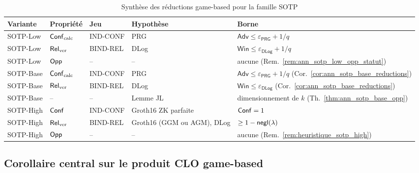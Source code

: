\begin{sloppypar}
\begin{table}[htbp]
\centering
\caption{Synth\`ese des r\'eductions game-based pour la famille SOTP}
\label{tab:ann_g_reductions}
\begin{tabular}{@{}lllll@{}}
\toprule
\textbf{Variante} & \textbf{Propri\'et\'e} & \textbf{Jeu} &
\textbf{Hypoth\`ese} & \textbf{Borne} \\
\midrule
SOTP-Low & $\mathsf{Conf}_{\mathrm{calc}}$ & IND-CONF & PRG
  & $\mathsf{Adv} \leq \varepsilon_{\mathsf{PRG}} + 1/q$ \\
SOTP-Low & $\mathsf{Rel}_{\mathrm{ver}}$ & BIND-REL & DLog
  & $\mathsf{Win} \leq \varepsilon_{\mathsf{DLog}} + 1/q$ \\
SOTP-Low & $\mathsf{Opp}$ & -- & --
  & aucune (Rem.~\ref{rem:ann_sotp_low_opp_statut}) \\
\midrule
SOTP-Base & $\mathsf{Conf}_{\mathrm{calc}}$ & IND-CONF & PRG
  & $\mathsf{Adv} \leq \varepsilon_{\mathsf{PRG}} + 1/q$ (Cor.~\ref{cor:ann_sotp_base_reductions}) \\
SOTP-Base & $\mathsf{Rel}_{\mathrm{ver}}$ & BIND-REL & DLog
  & $\mathsf{Win} \leq \varepsilon_{\mathsf{DLog}}$ (Cor.~\ref{cor:ann_sotp_base_reductions}) \\
SOTP-Base & -- & -- & Lemme JL
  & dimensionnement de $k$ (Th.~\ref{thm:ann_sotp_base_opp}) \\
\midrule
SOTP-High & $\mathsf{Conf}$ & IND-CONF & Groth16 ZK parfaite
  & $\mathsf{Conf} = 1$ \\
SOTP-High & $\mathsf{Rel}_{\mathrm{ver}}$ & BIND-REL & Groth16 (GGM ou AGM), DLog
  & $\geq 1-\mathsf{negl}(\lambda)$ \\
SOTP-High & $\mathsf{Opp}$ & -- & --
  & aucune (Rem.~\ref{rem:heuristique_sotp_high}) \\
\bottomrule
\end{tabular}
\end{table}

\subsection{Corollaire central sur le produit CLO game-based}


\end{sloppypar}

